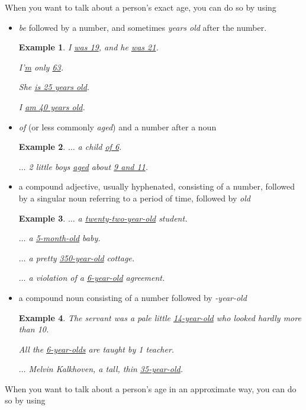 \documentclass[oneside]{book}
\numberwithin{equation}{section}
\newtheorem{example}{Example}[section]
\begin{document}
%
\noindent{} When you want to talk about a person's exact age, you can do so by using
\begin{itemize}
    \item \textit{be} followed by a number, and sometimes \textit{years old} after the number.
    \begin{example}
        I \underline{was 19}, and he \underline{was 21}.
        
        I'\underline{m} only \underline{63}.
        
        She \underline{is 25 years old}.
        
        I \underline{am 40 years old}.
    \end{example}
    \item \textit{of} (or less commonly \textit{aged}) and a number after a noun
    \begin{example}
        $\ldots$ a child \underline{of 6}.
        
        $\ldots$ 2 little boys \underline{aged} about \underline{9 and 11}.
    \end{example}
    \item a compound adjective, usually hyphenated, consisting of a number, followed by a singular noun referring to a period of time, followed by \textit{old}
    \begin{example}
        $\ldots$ a \underline{twenty-two-year-old} student.
        
        $\ldots$ a \underline{5-month-old} baby.
        
        $\ldots$ a pretty \underline{350-year-old} cottage.
        
        $\ldots$ a violation of a \underline{6-year-old} agreement.
    \end{example}
    \item a compound noun consisting of a number followed by \textit{-year-old}
    \begin{example}
        The servant was a pale little \underline{14-year-old} who looked hardly more than 10.
        
        All the \underline{6-year-olds} are taught by 1 teacher.
        
        $\ldots$ Melvin Kalkhoven, a tall, thin \underline{35-year-old}.
    \end{example}
\end{itemize}
%
\noindent{} When you want to talk about a person's age in an approximate way, you can do so by using
\end{document}
